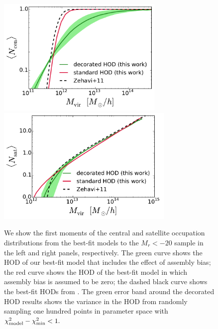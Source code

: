 \documentclass[usenatbib,usegraphicx,letterpaper]{mn2e}
\newcommand{\magr}{M_r}
\begin{document}
\begin{figure}
\begin{center}
\includegraphics[width=8.0cm]{central_hod_comparison.pdf}
\includegraphics[width=8.5cm]{satellite_hod_comparison.pdf}
\caption{
We show the first moments of the central and satellite occupation distributions
from the best-fit models to the $\magr<-20$ sample in the left and right
panels, respectively. The green curve shows the HOD of our best-fit model
that includes the effect of assembly bias; the red curve shows the HOD
of the best-fit model in which assembly bias is assumed to be zero;
the dashed black curve shows the best-fit HODs from \citet{zehavi_etal11}.
The green error band around the decorated HOD results shows the variance
in the HOD from randomly sampling one hundred points in parameter space
with $\chi^{2}_{\rm model} - \chi^{2}_{\rm min} < 1.$
}
\label{fig:directhodcomparison}
\end{center}
\end{figure}
\end{document}
